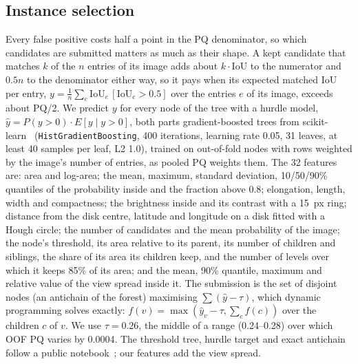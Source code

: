 \documentclass[sigconf]{acmart}
\begin{document}
\subsection{Instance selection}
Every false positive costs half a point in the PQ denominator, so which candidates are submitted matters as much as their shape. A kept candidate that matches $k$ of the $n$ entries of its image adds about $k\cdot\mathrm{IoU}$ to the numerator and $0.5n$ to the denominator either way, so it pays when its expected matched IoU per entry, $y = \frac{1}{n}\sum_{e} \mathrm{IoU}_e\,[\mathrm{IoU}_e > 0.5]$ over the entries $e$ of its image, exceeds about PQ/2. We predict $y$ for every node of the tree with a hurdle model, $\hat y = P(y>0)\cdot E[y \mid y>0]$, both parts gradient-boosted trees from scikit-learn~\cite{sklearn} (\texttt{HistGradientBoosting}, 400 iterations, learning rate 0.05, 31 leaves, at least 40 samples per leaf, L2 1.0), trained on out-of-fold nodes with rows weighted by the image's number of entries, as pooled PQ weights them. The 32 features are: area and log-area; the mean, maximum, standard deviation, 10/50/90\% quantiles of the probability inside and the fraction above 0.8; elongation, length, width and compactness; the brightness inside and its contrast with a 15~px ring; distance from the disk centre, latitude and longitude on a disk fitted with a Hough circle; the number of candidates and the mean probability of the image; the node's threshold, its area relative to its parent, its number of children and siblings, the share of its area its children keep, and the number of levels over which it keeps 85\% of its area; and the mean, 90\% quantile, maximum and relative value of the view spread inside it. The submission is the set of disjoint nodes (an antichain of the forest) maximising $\sum(\hat y - \tau)$, which dynamic programming solves exactly: $f(v) = \max(\hat y_v - \tau, \sum_{c} f(c))$ over the children $c$ of $v$. We use $\tau = 0.26$, the middle of a range (0.24--0.28) over which OOF PQ varies by 0.0004. The threshold tree, hurdle target and exact antichain follow a public notebook~\cite{tushhaaarrrr2026}; our features add the view spread.
\end{document}
